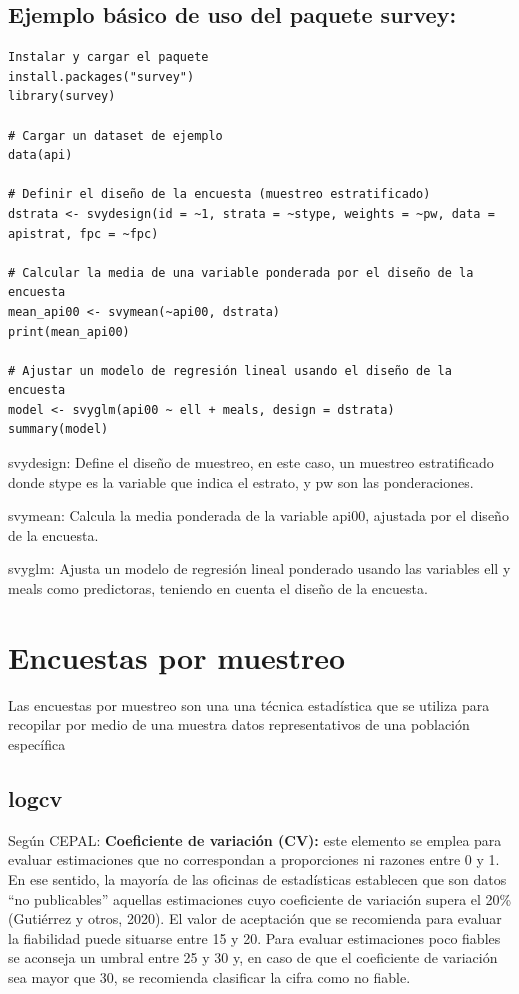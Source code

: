 \documentclass[12pt,spanish]{article}
\begin{document}
\subsection{Ejemplo básico de uso del paquete survey:}

\begin{verbatim}
Instalar y cargar el paquete
install.packages("survey")
library(survey)

# Cargar un dataset de ejemplo
data(api)

# Definir el diseño de la encuesta (muestreo estratificado)
dstrata <- svydesign(id = ~1, strata = ~stype, weights = ~pw, data = apistrat, fpc = ~fpc)

# Calcular la media de una variable ponderada por el diseño de la encuesta
mean_api00 <- svymean(~api00, dstrata)
print(mean_api00)

# Ajustar un modelo de regresión lineal usando el diseño de la encuesta
model <- svyglm(api00 ~ ell + meals, design = dstrata)
summary(model)

\end{verbatim}

svydesign: Define el diseño de muestreo, en este caso, un muestreo estratificado donde stype es la variable que indica el estrato, y pw son las ponderaciones.

svymean: Calcula la media ponderada de la variable api00, ajustada por el diseño de la encuesta.

svyglm: Ajusta un modelo de regresión lineal ponderado usando las variables ell y meals como predictoras, teniendo en cuenta el diseño de la encuesta.

\section*{Encuestas por muestreo}

Las encuestas por muestreo son una una técnica estadística que se utiliza para recopilar por medio de una muestra datos representativos de una población específica

\subsection*{logcv}
Según CEPAL:
\textbf{Coeficiente de variación (CV):} este elemento se emplea para evaluar estimaciones que no correspondan a proporciones ni razones entre 0 y 1. En ese sentido, la mayoría de las oficinas de estadísticas establecen que son datos “no publicables” aquellas estimaciones cuyo coeficiente de variación supera el 20\% (Gutiérrez y otros, 2020). El valor de aceptación que se 
recomienda para evaluar la fiabilidad puede situarse entre 15 y 20. Para evaluar estimaciones poco fiables se aconseja un umbral entre 25 y 30 y, en caso de que el coeficiente de variación sea mayor que 30, se recomienda clasificar la cifra como no fiable. 
\end{document}
